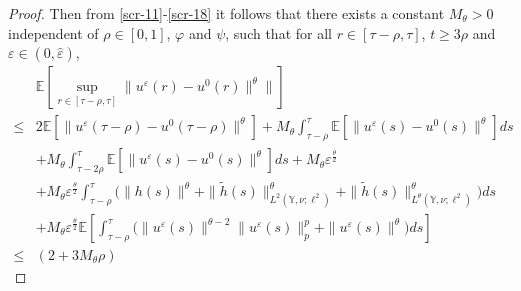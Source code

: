 \documentclass[11pt]{article}
\numberwithin{equation}{section}
\theoremstyle{plain}
\begin{document}
\begin{proof}
 Then from \eqref{scr-11}-\eqref{scr-18}
 it follows that there exists a constant $M_\theta > 0$ independent of $\rho \in [0,1]$, $\varphi$ and $\psi$, such that for all $r \in [\tau-\rho, \tau]$, $t \ge 3\rho$ and $\varepsilon \in (0, \hat{\varepsilon} )$,
 \begin{align}\label{scr-19}
       & \mathbb{E} 
                  \left[ \sup_{r \in [\tau -\rho, \tau] } 
                               \| u^{\varepsilon} (r) - u^0(r) \|^\theta \| \right]  \nonumber\\
 \le & 2 \mathbb{E} 
                      \left[ \| u^{\varepsilon} (\tau-\rho) - u^0(\tau-\rho)\|^\theta \right]  
          + M_\theta
                    \int_{\tau-\rho}^{\tau}
           	                        \mathbb{E}
           	                           	   \left[ \| u^{\varepsilon}(s) - u^0(s) \|^{\theta}
           	                               \right]
           	                     ds  \nonumber\\    
      & + M_\theta  
                   \int_{\tau-2\rho}^{\tau}
           	                        \mathbb{E}
           	                           	   \left[ \| u^{\varepsilon}(s) - u^0(s) \|^{\theta}
           	                               \right]
           	                     ds  
          + M_\theta \varepsilon^{\frac{\theta}{2} }  \nonumber\\
      & + M_\theta \varepsilon^{\frac{\theta}{2} }  
                           \int_{\tau-\rho}^{\tau}
                  	                \big( \|h(s)\|^\theta
                  	                         + \| \widetilde{h}(s) \|_{L^2(\mathbb{Y}, \nu; \ell^2) }^\theta
                  	                         + \| \widetilde{h}(s) \|^{\theta}_{L^{\theta}(\mathbb{Y}, \nu; \ell^2) }
                  	                \big)  
                  	        ds  \nonumber\\
      & + M_\theta \varepsilon^{\frac{\theta}{2} } 
                          \mathbb{E}
                                	              \left[  \int_{\tau-\rho}^{\tau}   
                                                             \big( \|u^{\varepsilon}(s)\|^{\theta-2} \|u^{\varepsilon}(s)\|_p^{p} 
                                                                    	+ \|u^{\varepsilon}(s)\|^{\theta}  
                                                             \big)
                                                         ds
                                                 \right]  \nonumber\\
 \le & \left( 2 + 3 M_\theta \rho \right) 

\end{align}
\end{proof}
\end{document}
